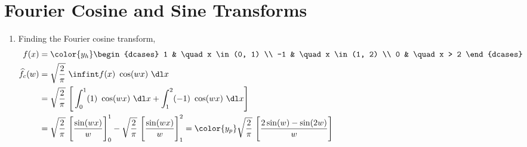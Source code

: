 \section{Fourier Cosine and Sine Transforms}

\begin{enumerate}
    \item Finding the Fourier cosine transform,
          \begin{align}
              f(x)             & = \color{y_h} \begin{dcases}
                                                   1  & \quad x \in (0, 1) \\
                                                   -1 & \quad x \in (1, 2) \\
                                                   0  & \quad x > 2
                                               \end{dcases}                 \\
              \widehat{f}_c(w) & = \sqrt{\frac{2}{\pi}}\ \infint f(x)\ \cos(wx)\ \dl x \\
                               & = \sqrt{\frac{2}{\pi}}\ \Bigg[\int_{0}^{1} (1)
                  \ \cos(wx)\ \dl x
              + \int_{1}^{2} (-1)\ \cos(wx) \ \dl x\Bigg]                              \\
                               & = \sqrt{\frac{2}{\pi}}\ \Bigg[ \frac{\sin(wx)}{w}
                  \Bigg]_0^1
              - \sqrt{\frac{2}{\pi}}\ \Bigg[ \frac{\sin(wx)}{w} \Bigg]_1^2
              = \color{y_p} \sqrt{\frac{2}{\pi}}\ \Bigg[\frac{2\sin(w)
                      - \sin(2w)}{w}\Bigg]
          \end{align}


\end{enumerate}
